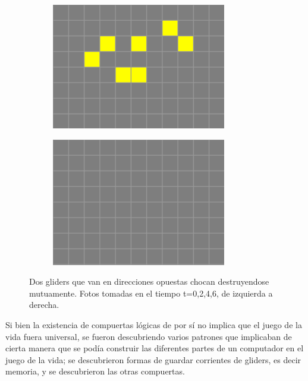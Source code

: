 \begin{figure}[h]
\begin{subfigure}{0.22\textwidth}
        \includegraphics[width=\textwidth]{images/life-glider-collission-3.png}
    \end{subfigure}
    \begin{subfigure}{0.22\textwidth}
        \includegraphics[width=\textwidth]{images/life-glider-collission-4.png}
    \end{subfigure}
    \caption{Dos gliders que van en direcciones opuestas chocan destruyendose mutuamente. Fotos tomadas en el tiempo t=0,2,4,6, de izquierda a derecha.}
    \label{figure:glider-collission}
\end{figure}

Si bien la existencia de compuertas l\'ogicas de por s\'i no implica que el juego de la vida fuera universal, se fueron descubriendo varios patrones que implicaban de cierta manera que se pod\'ia construir las diferentes partes de un computador en el juego de la vida; se descubrieron formas de guardar corrientes de gliders, es decir memoria, y se descubrieron las otras compuertas.

